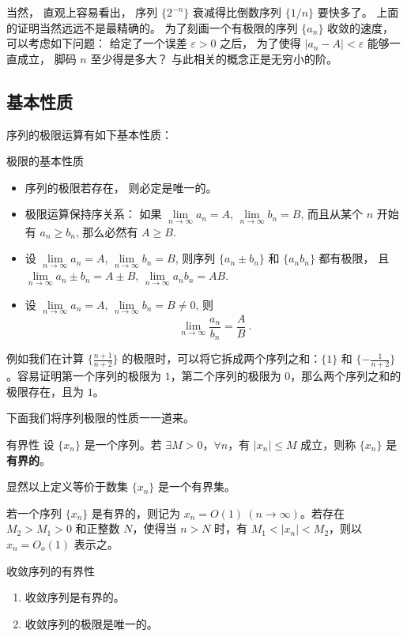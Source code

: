 当然， 直观上容易看出， 序列 $\{2^{-n}\}$ 衰减得比倒数序列 $\{1/n\}$ 要快多了。 上面的证明当然远远不是最精确的。 为了刻画一个有极限的序列 $\{a_n\}$ 收敛的速度， 可以考虑如下问题： 给定了一个误差 $\varepsilon>0$ 之后， 为了使得 $|a_n-A|<\varepsilon$ 能够一直成立， 脚码 $n$ 至少得是多大？ 与此相关的概念正是无穷小的阶。

\subsection{基本性质}
序列的极限运算有如下基本性质：

\begin{theorem}{极限的基本性质}
\begin{itemize}
\item 序列的极限若存在， 则必定是唯一的。
\item 极限运算保持序关系： 如果 $\lim\limits_{n\to\infty}a_n=A$, $\lim\limits_{n\to\infty}b_n=B$, 而且从某个 $n$ 开始有 $a_n\geq b_n$, 那么必然有 $A\geq B$.
\item 设 $\lim\limits_{n\to\infty}a_n=A$, $\lim\limits_{n\to\infty}b_n=B$, 则序列 $\{a_n\pm b_n\}$ 和 $\{a_n b_n\}$ 都有极限， 且 $\lim\limits_{n\to\infty}a_n\pm b_n=A\pm B$, $\lim\limits_{n\to\infty}a_nb_n=AB$.
\item 设 $\lim\limits_{n\to\infty}a_n=A$, $\lim\limits_{n\to\infty}b_n=B\neq0$, 则
$$
\lim\limits_{n\to\infty}\frac{a_n}{b_n}=\frac{A}{B}~.
$$
\end{itemize}
\end{theorem}

例如我们在计算 $\{\frac{n+1}{n+2}\}$ 的极限时，可以将它拆成两个序列之和：$\{1\}$ 和 $\{-\frac{1}{n+2}\}$。容易证明第一个序列的极限为 $1$，第二个序列的极限为 $0$，那么两个序列之和的极限存在，且为 $1$。

下面我们将序列极限的性质一一道来。

\begin{definition}{有界性}
设 $\{x_n\}$ 是一个序列。若 $\exists M>0$，$\forall n$，有 $|x_n|\leq M$ 成立，则称 $\{x_n\}$ 是\textbf{有界的}。

显然以上定义等价于数集 $\{x_n\}$ 是一个有界集。

若一个序列 $\{x_n\}$ 是有界的，则记为 $x_n=O(1)\ (n\rightarrow \infty)$。若存在 $M_2>M_1>0$ 和正整数 $N$，使得当 $n>N$ 时，有 $M_1<|x_n|<M_2$，则以 $x_n=O_o(1)$ 表示之。
\end{definition}
  
\begin{theorem}{收敛序列的有界性}
\begin{enumerate}
\item 收敛序列是有界的。
\item 收敛序列的极限是唯一的。
\end{enumerate}
\end{theorem}

